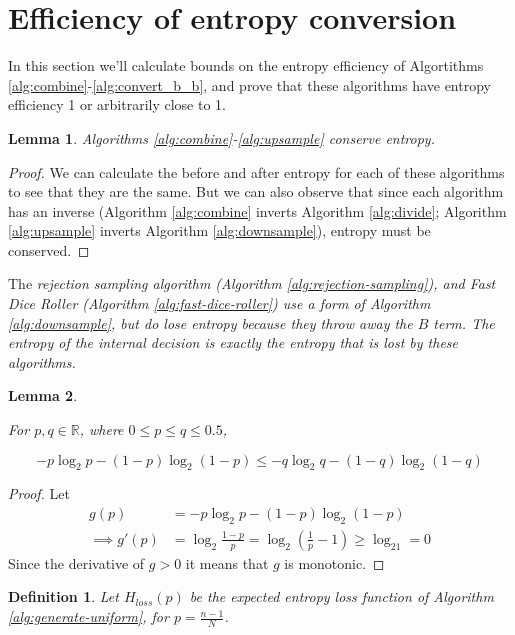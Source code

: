 \documentclass[12pt]{article}
\newtheorem{lemma}{Lemma}
\newtheorem{definition}{Definition}
\begin{document}
\section {Efficiency of entropy conversion}

In this section we'll calculate bounds on the entropy efficiency of Algortithms \ref{alg:combine}-\ref{alg:convert_b_b}, and prove that these algorithms have entropy efficiency 1 or arbitrarily close to 1.

\begin{lemma}
\label{lem:conservation}
Algorithms \ref{alg:combine}-\ref{alg:upsample} conserve entropy.
\end{lemma}

\begin{proof}
We can calculate the before and after entropy for each of these algorithms to see that they are the same. But we can also observe that since each algorithm has an inverse (Algorithm \ref{alg:combine} inverts Algorithm \ref{alg:divide}; Algorithm \ref{alg:upsample} inverts Algorithm \ref{alg:downsample}), entropy must be conserved.
\end{proof}

The \em rejection sampling \em algorithm (Algorithm \ref{alg:rejection-sampling}), and Fast Dice Roller (Algorithm \ref{alg:fast-dice-roller}) use a form of Algorithm \ref{alg:downsample}, but do lose entropy because they throw away the $B$ term. The entropy of the internal decision is exactly the entropy that is lost by these algorithms.

\begin{lemma}
    \label{lem:shannon-inequality}

For $p,q \in \mathbb{R}$, where $0 \le p\le q \le 0.5$, 

\begin{equation}
-p\log_2 p - (1-p)\log_2(1-p) \le -q\log_2 q - (1-q)\log_2(1-q)
\end{equation}
\end{lemma}

\begin{proof}
    Let
    \begin{align}
        g(p) & = -p\log_2 p - (1-p)\log_2(1-p) \\
        \implies g'(p) & = \log_2\frac{1-p}{p} = \log_2(\frac{1}{p}-1) \ge \log_21 = 0 
    \end{align}
Since the derivative of $g>0$ it means that $g$ is monotonic.
\end{proof}

\begin{definition}
    Let $H_{loss}(p)$ be the expected entropy loss function of Algorithm \ref{alg:generate-uniform}, for $p=\frac{n-1}{N}$.
\end{definition}
\end{document}
